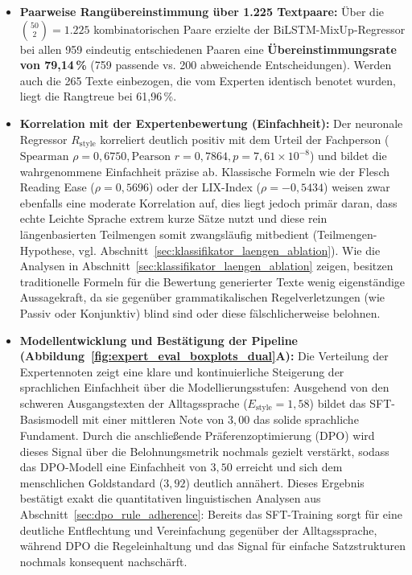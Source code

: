 \begin{itemize}
    \item \textbf{Paarweise Rangübereinstimmung über 1.225 Textpaare:} Über die $\binom{50}{2} = 1.225$ kombinatorischen Paare erzielte der BiLSTM-MixUp-Regressor bei allen 959 eindeutig entschiedenen Paaren eine \textbf{Übereinstimmungsrate von 79{,}14\,\%} (759 passende vs. 200 abweichende Entscheidungen). Werden auch die 265 Texte einbezogen, die vom Experten identisch benotet wurden, liegt die Rangtreue bei 61{,}96\,\%.
    \item \textbf{Korrelation mit der Expertenbewertung (Einfachheit):} Der neuronale Regressor $R_{\text{style}}$ korreliert deutlich positiv mit dem Urteil der Fachperson ($\text{Spearman } \rho = 0{,}6750, \text{Pearson } r = 0{,}7864, p = 7{,}61 \times 10^{-8}$) und bildet die wahrgenommene Einfachheit präzise ab. Klassische Formeln wie der Flesch Reading Ease ($\rho = 0{,}5696$) oder der LIX-Index ($\rho = -0{,}5434$) weisen zwar ebenfalls eine moderate Korrelation auf, dies liegt jedoch primär daran, dass echte Leichte Sprache extrem kurze Sätze nutzt und diese rein längenbasierten Teilmengen somit zwangsläufig mitbedient (Teilmengen-Hypothese, vgl. Abschnitt~\ref{sec:klassifikator_laengen_ablation}). Wie die Analysen in Abschnitt~\ref{sec:klassifikator_laengen_ablation} zeigen, besitzen traditionelle Formeln für die Bewertung generierter Texte wenig eigenständige Aussagekraft, da sie gegenüber grammatikalischen Regelverletzungen (wie Passiv oder Konjunktiv) blind sind oder diese fälschlicherweise belohnen.
    \item \textbf{Modellentwicklung und Bestätigung der Pipeline (Abbildung~\ref{fig:expert_eval_boxplots_dual}A):} Die Verteilung der Expertennoten zeigt eine klare und kontinuierliche Steigerung der sprachlichen Einfachheit über die Modellierungsstufen: Ausgehend von den schweren Ausgangstexten der Alltagssprache ($E_{\text{style}} = 1{,}58$) bildet das SFT-Basismodell mit einer mittleren Note von $3{,}00$ das solide sprachliche Fundament. Durch die anschließende Präferenzoptimierung (DPO) wird dieses Signal über die Belohnungsmetrik nochmals gezielt verstärkt, sodass das DPO-Modell eine Einfachheit von $3{,}50$ erreicht und sich dem menschlichen Goldstandard ($3{,}92$) deutlich annähert. Dieses Ergebnis bestätigt exakt die quantitativen linguistischen Analysen aus Abschnitt~\ref{sec:dpo_rule_adherence}: Bereits das SFT-Training sorgt für eine deutliche Entflechtung und Vereinfachung gegenüber der Alltagssprache, während DPO die Regeleinhaltung und das Signal für einfache Satzstrukturen nochmals konsequent nachschärft.

\end{itemize}

